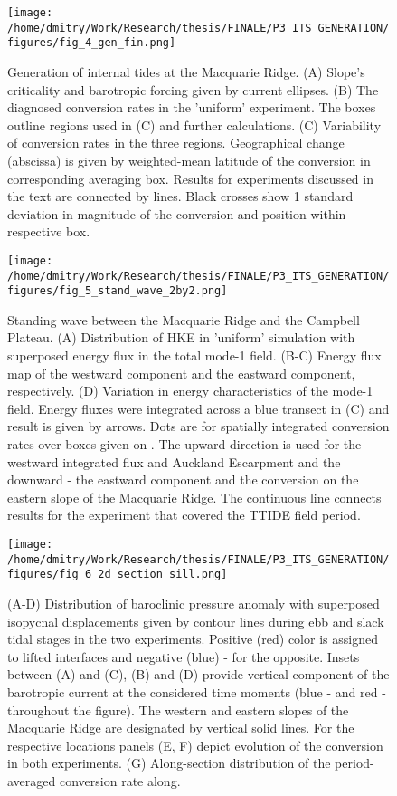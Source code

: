 \documentclass[12pt]{article}
\newcommand{\SCALEO}{2}
\newcommand{\SCALET}{1.25}
\begin{document}
\begin{figure}
	\centering
	\texttt{[image: /home/dmitry/Work/Research/thesis/FINALE/P3\_ITS\_GENERATION/figures/fig\_4\_gen\_fin.png]}
	\caption{Generation of internal tides at the Macquarie Ridge. (A) Slope's criticality and 
	barotropic forcing given by current ellipses. (B) The diagnosed conversion rates in the 
	'uniform' experiment. The boxes outline regions used in (C) and further calculations. (C) 
	Variability of conversion rates in the three regions. Geographical change (abscissa) is given 
	by weighted-mean latitude of the conversion in corresponding averaging box. Results for 
	experiments discussed in the text are connected by lines. Black crosses show 1 standard 
	deviation in magnitude of the conversion and position within respective box.}
	\label{C3.fig:gen}
\end{figure}

\begin{figure}
	\centering
	\texttt{[image: /home/dmitry/Work/Research/thesis/FINALE/P3\_ITS\_GENERATION/figures/fig\_5\_stand\_wave\_2by2.png]}
	\caption{Standing wave between the Macquarie Ridge and the Campbell Plateau. (A) Distribution 
	of HKE in 'uniform' simulation with superposed energy flux in the total mode-1 field. (B-C) 
	Energy flux map of the westward component and the eastward component, respectively. (D) 
	Variation in energy characteristics of the mode-1 field. Energy fluxes were integrated across 
	a blue transect in (C) and result is given by arrows. Dots are for spatially integrated 
	conversion 
	rates 
	over boxes given on . The upward direction is used for the westward 
	integrated flux and Auckland Escarpment and the downward - the eastward component and the 
	conversion on the eastern slope of the Macquarie Ridge. The continuous line connects results 
	for the experiment that covered the TTIDE field period.}
	\label{C3.fig:stand_wave}
\end{figure}

\begin{figure}
	\centering
	\texttt{[image: /home/dmitry/Work/Research/thesis/FINALE/P3\_ITS\_GENERATION/figures/fig\_6\_2d\_section\_sill.png]}
	\caption{(A-D) Distribution of baroclinic pressure anomaly with superposed isopycnal 
	displacements given by contour lines during ebb and slack tidal stages in the two experiments. 
	Positive (red) color is assigned to lifted interfaces and negative (blue) - for the opposite. 
	Insets between (A) and (C), (B) and (D) provide vertical component of the barotropic current 
	at the considered time moments (blue -  and red -  throughout the 
	figure). The western and eastern slopes of the Macquarie Ridge are 
	designated by vertical solid lines. For the respective locations panels (E, F) depict evolution 
	of the conversion in both experiments. (G) Along-section distribution of the period-averaged 
	conversion rate along.}
	\label{C3.fig:gen_2d}
\end{figure}
\end{document}
